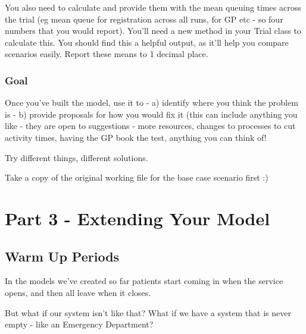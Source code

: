 \documentclass[
  letterpaper,
  DIV=11,
  numbers=noendperiod]{scrreprt}
\begin{document}
You also need to calculate and provide them with the mean queuing times
across the trial (eg mean queue for registration across all runs, for GP
etc - so four numbers that you would report). You'll need a new method
in your Trial class to calculate this. You should find this a helpful
output, as it'll help you compare scenarios easily. Report these means
to 1 decimal place.

\section{Goal}\label{goal}

Once you've built the model, use it to - a) identify where you think the
problem is - b) provide proposals for how you would fix it (this can
include anything you like - they are open to suggestions - more
resources, changes to processes to cut activity times, having the GP
book the test, anything you can think of!

Try different things, different solutions.

\begin{tcolorbox}[enhanced jigsaw, colframe=quarto-callout-tip-color-frame, bottomtitle=1mm, breakable, rightrule=.15mm, coltitle=black, colbacktitle=quarto-callout-tip-color!10!white, opacityback=0, leftrule=.75mm, arc=.35mm, toptitle=1mm, title=\textcolor{quarto-callout-tip-color}{\faLightbulb}\hspace{0.5em}{Tip}, titlerule=0mm, colback=white, toprule=.15mm, bottomrule=.15mm, left=2mm, opacitybacktitle=0.6]

Take a copy of the original working file for the base case scenario
first :)

\end{tcolorbox}

\part{Part 3 - Extending Your Model}

\chapter{Warm Up Periods}\label{sec-warmup}

In the models we've created so far patients start coming in when the
service opens, and then all leave when it closes.

But what if our system isn't like that? What if we have a system that is
never empty - like an Emergency Department?
\end{document}
